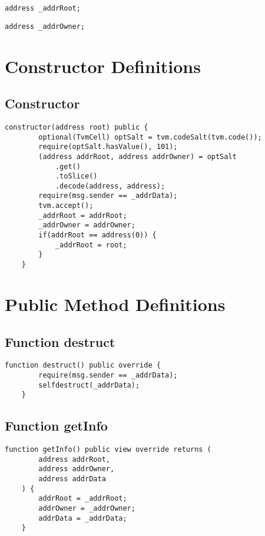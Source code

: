 \begin{lstlisting}[firstnumber=9]
    address _addrRoot;
\end{lstlisting}

\begin{lstlisting}[firstnumber=10]
    address _addrOwner;
\end{lstlisting}

\section{Constructor Definitions}


\subsection{Constructor}





\begin{lstlisting}[firstnumber=13]
    constructor(address root) public {
        optional(TvmCell) optSalt = tvm.codeSalt(tvm.code());
        require(optSalt.hasValue(), 101);
        (address addrRoot, address addrOwner) = optSalt
            .get()
            .toSlice()
            .decode(address, address);
        require(msg.sender == _addrData);
        tvm.accept();
        _addrRoot = addrRoot;
        _addrOwner = addrOwner;
        if(addrRoot == address(0)) {
            _addrRoot = root;
        }
    }
\end{lstlisting}

\section{Public Method Definitions}


\subsection{Function destruct}

\begin{lstlisting}[firstnumber=39]
    function destruct() public override {
        require(msg.sender == _addrData);
        selfdestruct(_addrData);
    }
\end{lstlisting}

\subsection{Function getInfo}

\begin{lstlisting}[firstnumber=29]
    function getInfo() public view override returns (
        address addrRoot,
        address addrOwner,
        address addrData
    ) {
        addrRoot = _addrRoot;
        addrOwner = _addrOwner;
        addrData = _addrData;
    }
\end{lstlisting}
